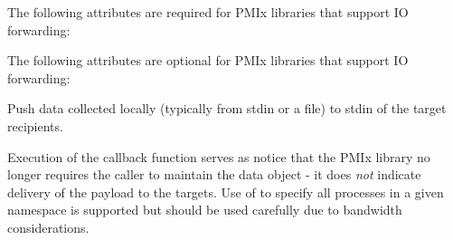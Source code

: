 \reqattrstart
The following attributes are required for \ac{PMIx} libraries that support \ac{IO} forwarding:


\reqattrend

\optattrstart
The following attributes are optional for \ac{PMIx} libraries that support \ac{IO} forwarding:


\optattrend

\descr

Push data collected locally (typically from stdin or a file) to stdin of the target recipients.

\adviceuserstart
Execution of the  callback function serves as notice that the \ac{PMIx} library no longer requires the caller to maintain the  data object - it does \textit{not} indicate delivery of the payload to the targets. Use of  to specify all processes in a given namespace is supported but should be used carefully due to bandwidth considerations.
\adviceuserend


